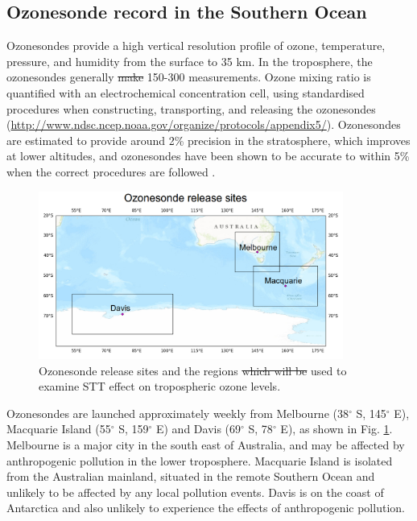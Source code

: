 \documentclass[acp, manuscript]{copernicus} %
\providecommand{\DIFadd}[1]{{\protect\color{blue}\uwave{#1}}} %
\providecommand{\DIFdel}[1]{{\protect\color{red}\sout{#1}}}                      %
\providecommand{\DIFaddbegin}{} %
\providecommand{\DIFaddend}{} %
\providecommand{\DIFdelbegin}{} %
\providecommand{\DIFdelend}{} %
\providecommand{\DIFdelFL}[1]{\DIFdel{#1}} %
\providecommand{\DIFdelbeginFL}{} %
\providecommand{\DIFdelendFL}{} %
\begin{document}
  \subsection{Ozonesonde record in the Southern Ocean}
  \label{sec:ozonesondes}
    Ozonesondes provide a high vertical resolution profile of ozone, temperature, pressure, and humidity from the surface \DIFaddbegin \DIFadd{and up }\DIFaddend to 35 km.
    In the troposphere, the ozonesondes generally \DIFdelbegin \DIFdel{make }\DIFdelend \DIFaddbegin \DIFadd{perform }\DIFaddend 150-300 measurements.    
    Ozone mixing ratio is quantified with an electrochemical concentration cell, using standardised procedures when constructing, transporting, and releasing the ozonesondes (\url{http://www.ndsc.ncep.noaa.gov/organize/protocols/appendix5/}).
    Ozonesondes are estimated to provide around 2\% precision in the stratosphere, which improves at lower altitudes, and ozonesondes have been shown to be accurate to within 5\% when the correct procedures are followed \citep{Smit2007}.

    \begin{figure}
      \includegraphics[width=10cm]{figures/ComparisonRegions.png}
      \caption{Ozonesonde release sites and the regions \DIFdelbeginFL \DIFdelFL{which will be }\DIFdelendFL used to examine STT effect on tropospheric ozone levels.}
      \label{fig:ComparisonRegion}
    \end{figure}

    Ozonesondes are launched approximately weekly from Melbourne (38$^{\circ}$ S, 145$^{\circ}$ E), Macquarie Island (55$^{\circ}$ S, 159$^{\circ}$ E) and Davis (69$^{\circ}$ S, 78$^{\circ}$ E), as shown in Fig. \ref{fig:ComparisonRegion}. 
    Melbourne is a major city in the south east of Australia, and may be affected by anthropogenic pollution in the lower troposphere.
    Macquarie Island is isolated from the Australian mainland, situated in the remote Southern Ocean and unlikely to be affected by any local pollution events.
    Davis is on the coast of Antarctica and also unlikely to experience the effects of anthropogenic pollution.
\end{document}
